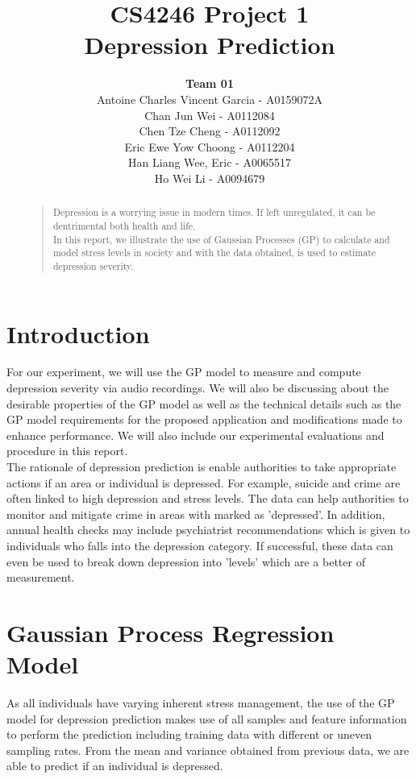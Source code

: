 \documentclass{article}
\title{
	CS4246 Project 1\\ Depression Prediction
}
\author{
	{\bf Team 01} \\
	Antoine Charles Vincent Garcia - A0159072A\\
	Chan Jun Wei - A0112084\\
	Chen Tze Cheng - A0112092\\
	Eric Ewe Yow Choong - A0112204\\
	Han Liang Wee, Eric - A0065517\\
	Ho Wei Li - A0094679\\
}
\begin{document}
 	\maketitle

	\begin{abstract}
	\begin{quote}
	Depression is a worrying issue in modern times. If left unregulated, it can be dentrimental both health and life. \\
	
	In this report, we illustrate the use of Gaussian Processes (GP) to calculate and model stress levels in society and with the data obtained, is used to estimate depression severity.
	\end{quote}
	\end{abstract}
	
	\section{Introduction}
	For our experiment, we will use the GP model to measure and compute depression severity via audio recordings. We will also be discussing about the desirable properties of the GP model as well as the technical details such as the GP model requirements for the proposed application and modifications made to enhance performance. We will also include our experimental evaluations and procedure in this report. \\

	The rationale of depression prediction is enable authorities to take appropriate actions if an area or individual is depressed. For example, suicide and crime are often linked to high depression and stress levels. The data can help authorities to monitor and mitigate crime in areas with marked as 'depressed'. In addition, annual health checks may include psychiatrist recommendations which is given to individuals who falls into the depression category. If successful, these data can even be used to break down depression into 'levels' which are a better of measurement. \\

	\section{Gaussian Process Regression Model}
	As all individuals have varying inherent stress management, the use of the GP model for depression prediction makes use of all samples and feature information to perform the prediction including training data with different or uneven sampling rates. From the mean and variance obtained from previous data, we are able to predict if an individual is depressed. \\	
\end{document}

